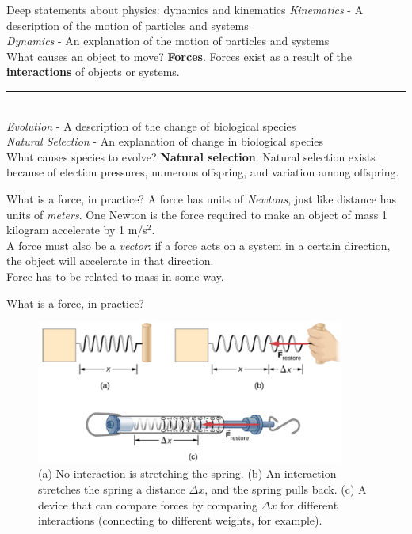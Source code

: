 \documentclass{beamer}
\begin{document}
\begin{frame}{Deep statements about physics: dynamics and kinematics}
\small
\textit{Kinematics} - A \alert{description} of the motion of particles and systems \\
\textit{Dynamics} - An \alert{explanation} of the motion of particles and systems \\
\vspace{0.25cm}
What causes an object to move?  \textbf{Forces}.  Forces exist as a result of the \alert{\textbf{interactions}} of objects or systems.\\
\vspace{0.25cm}
\rule{10cm}{0.4pt} \\
\vspace{0.25cm}
\textit{Evolution} - A \alert{description} of the change of biological species \\
\textit{Natural Selection} - An \alert{explanation} of change in biological species \\
\vspace{0.25cm}
What causes species to evolve?  \textbf{Natural selection}.  Natural selection exists because of \alert{election pressures}, \alert{numerous offspring}, and \alert{variation} among offspring.
\end{frame}

\begin{frame}{What is a force, in practice?}
A force has units of \textit{Newtons}, just like distance has units of \textit{meters}.  One Newton is the force required to make an object of mass 1 kilogram accelerate by 1 m/s$^2$.\\
\vspace{1cm}
A force must also be a \textit{vector}: if a force acts on a system in a certain direction, the object will accelerate in that direction. \\
\vspace{1cm}
Force has to be related to mass in some way.
\end{frame}

\begin{frame}{What is a force, in practice?}
\small
\begin{figure}
\centering
\includegraphics[width=0.9\textwidth]{figures/force1.png}
\caption{\label{fig:force1} (a) No interaction is stretching the spring.  (b) An interaction stretches the spring a distance $\Delta x$, and the spring pulls back.  (c) A device that can compare forces by comparing $\Delta x$ for different interactions (connecting to different weights, for example).}
\end{figure}
\end{frame}
\end{document}
